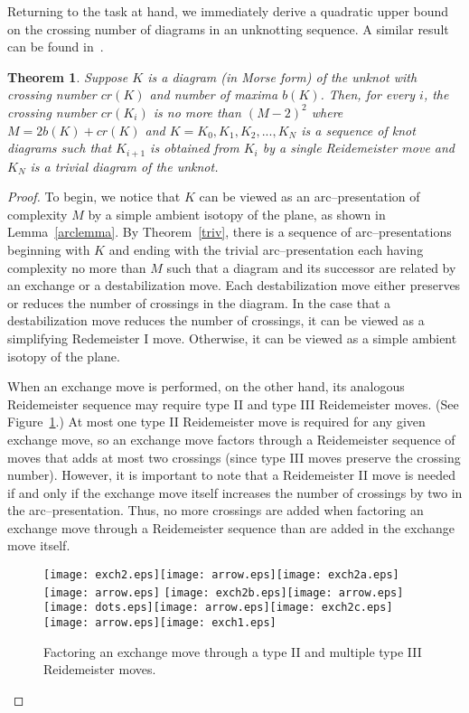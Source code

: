 \documentclass{amsart}
\newtheorem{theorem}{Theorem}
\begin{document}
Returning to the task at hand, we immediately derive a quadratic upper bound on the crossing number of diagrams in an unknotting sequence. A similar result can be found in~\cite{dynnikov}.

\begin{theorem}
Suppose $K$ is a diagram (in Morse form) of the unknot with crossing number $cr(K)$ and number of maxima $b(K)$. Then, for every $i$, the crossing number $cr(K_i)$ is no more than $(M-2)^2$ where $M=2b(K)+cr(K)$ and $K=K_0, K_1, K_2, ..., K_N$ is a sequence of knot diagrams such that $K_{i+1}$ is obtained from $K_i$ by a single Reidemeister move and $K_N$ is a trivial diagram of the unknot.
\end{theorem}

\begin{proof}
To begin, we notice that $K$ can be viewed as an arc--presentation of complexity $M$ by a simple ambient isotopy of the plane, as shown in Lemma~\ref{arclemma}. By Theorem~\ref{triv}, there is a sequence of arc--presentations beginning with $K$ and ending with the trivial arc--presentation each having complexity no more than $M$ such that a diagram and its successor are related by an exchange or a destabilization move. Each destabilization move either preserves or reduces the number of crossings in the diagram. In the case that a destabilization move reduces the number of crossings, it can be viewed as a simplifying Redemeister I move. Otherwise, it can be viewed as a simple ambient isotopy of the plane. 

When an exchange move is performed, on the other hand, its analogous Reidemeister sequence may require type II and type III Reidemeister moves. (See Figure~\ref{factor}.) At most one type II Reidemeister move is required for any given exchange move, so an exchange move factors through a Reidemeister sequence of moves that adds at most two crossings (since type III moves preserve the crossing number). However, it is important to note that a Reidemeister II move is needed if and only if the exchange move itself increases the number of crossings by two in the arc--presentation. Thus, no more crossings are added when factoring an exchange move through a Reidemeister sequence than are added in the exchange move itself.

\begin{figure}[h]
\begin{center}
\texttt{[image: exch2.eps]}\texttt{[image: arrow.eps]}\texttt{[image: exch2a.eps]}
\texttt{[image: arrow.eps]}
\vspace{-.3in}
\texttt{[image: exch2b.eps]}\texttt{[image: arrow.eps]}\texttt{[image: dots.eps]}\texttt{[image: arrow.eps]}\texttt{[image: exch2c.eps]}
\vspace{-.2in}
\texttt{[image: arrow.eps]}\texttt{[image: exch1.eps]}
\end{center}
\caption{ \small{Factoring an exchange move through a type II and multiple type III Reidemeister moves.}}
\label{factor}
\end{figure}


\end{proof}
\end{document}
